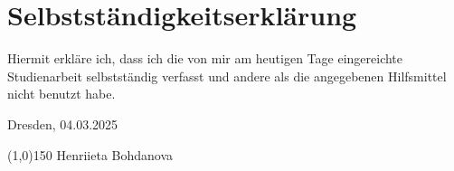 \chapter*{Selbstständigkeitserklärung}


	

Hiermit erkläre ich, dass ich die von mir am heutigen Tage eingereichte Studienarbeit selbstständig verfasst und andere als die angegebenen Hilfsmittel nicht benutzt habe.
		
\vspace{5mm}
	
Dresden, 04.03.2025
		
\vspace{15mm}
	
\begin{minipage}[t]{5,5cm}
	\line(1,0){150}
	\vspace{1em}
	Henriieta Bohdanova
\end{minipage}\hspace{4cm}



\cleardoublepage

